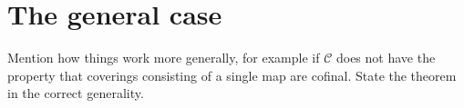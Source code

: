 \section{The general case}

\noindent
Mention how things work more generally, for example if $\mathcal{C}$
does not have the property that coverings consisting of a single map
are cofinal. State the theorem in the correct generality.







